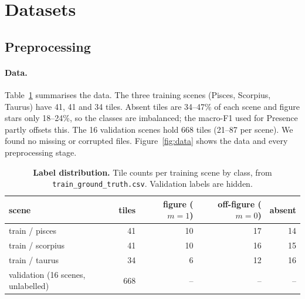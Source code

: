 \documentclass[a4paper,11pt]{article}
\begin{document}
\section{Datasets}

\subsection{Preprocessing}

\paragraph{Data.} Table~\ref{tab:data} summarises the data. The three training scenes (Pisces, Scorpius, Taurus) have
41, 41 and 34 tiles. Absent tiles are 34--47\% of each scene and figure stars only 18--24\%, so the classes are
imbalanced; the macro-F1 used for Presence partly offsets this. The 16 validation scenes hold 668 tiles (21--87 per
scene). We found no missing or corrupted files. Figure~\ref{fig:data} shows the data and every preprocessing stage.

\begin{table}[h]
\centering\small
\begin{tabular}{lrrrr}
\toprule
scene & tiles & figure ($m{=}1$) & off-figure ($m{=}0$) & absent \\
\midrule
train / pisces   & 41 & 10 & 17 & 14 \\
train / scorpius & 41 & 10 & 16 & 15 \\
train / taurus   & 34 &  6 & 12 & 16 \\
\midrule
validation (16 scenes, unlabelled) & 668 & -- & -- & -- \\
\bottomrule
\end{tabular}
\caption{\textbf{Label distribution.} Tile counts per training scene by class, from \texttt{train\_ground\_truth.csv}.
Validation labels are hidden.}
\label{tab:data}
\end{table}
\end{document}
